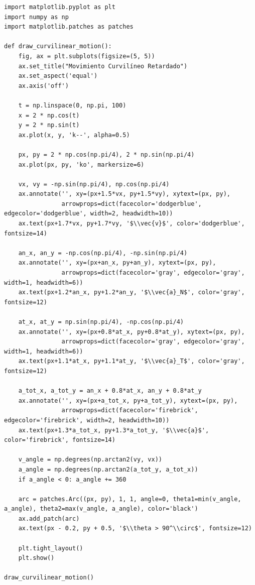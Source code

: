\documentclass[12pt, a4paper]{article}
\begin{document}
\begin{lstlisting}
import matplotlib.pyplot as plt
import numpy as np
import matplotlib.patches as patches

def draw_curvilinear_motion():
    fig, ax = plt.subplots(figsize=(5, 5))
    ax.set_title("Movimiento Curvilíneo Retardado")
    ax.set_aspect('equal')
    ax.axis('off')
    
    t = np.linspace(0, np.pi, 100)
    x = 2 * np.cos(t)
    y = 2 * np.sin(t)
    ax.plot(x, y, 'k--', alpha=0.5) 
    
    px, py = 2 * np.cos(np.pi/4), 2 * np.sin(np.pi/4)
    ax.plot(px, py, 'ko', markersize=6)
    
    vx, vy = -np.sin(np.pi/4), np.cos(np.pi/4) 
    ax.annotate('', xy=(px+1.5*vx, py+1.5*vy), xytext=(px, py),
                arrowprops=dict(facecolor='dodgerblue', edgecolor='dodgerblue', width=2, headwidth=10))
    ax.text(px+1.7*vx, py+1.7*vy, '$\\vec{v}$', color='dodgerblue', fontsize=14)
    
    an_x, an_y = -np.cos(np.pi/4), -np.sin(np.pi/4) 
    ax.annotate('', xy=(px+an_x, py+an_y), xytext=(px, py),
                arrowprops=dict(facecolor='gray', edgecolor='gray', width=1, headwidth=6))
    ax.text(px+1.2*an_x, py+1.2*an_y, '$\\vec{a}_N$', color='gray', fontsize=12)
    
    at_x, at_y = np.sin(np.pi/4), -np.cos(np.pi/4)
    ax.annotate('', xy=(px+0.8*at_x, py+0.8*at_y), xytext=(px, py),
                arrowprops=dict(facecolor='gray', edgecolor='gray', width=1, headwidth=6))
    ax.text(px+1.1*at_x, py+1.1*at_y, '$\\vec{a}_T$', color='gray', fontsize=12)
    
    a_tot_x, a_tot_y = an_x + 0.8*at_x, an_y + 0.8*at_y
    ax.annotate('', xy=(px+a_tot_x, py+a_tot_y), xytext=(px, py),
                arrowprops=dict(facecolor='firebrick', edgecolor='firebrick', width=2, headwidth=10))
    ax.text(px+1.3*a_tot_x, py+1.3*a_tot_y, '$\\vec{a}$', color='firebrick', fontsize=14)

    v_angle = np.degrees(np.arctan2(vy, vx))
    a_angle = np.degrees(np.arctan2(a_tot_y, a_tot_x))
    if a_angle < 0: a_angle += 360
    
    arc = patches.Arc((px, py), 1, 1, angle=0, theta1=min(v_angle, a_angle), theta2=max(v_angle, a_angle), color='black')
    ax.add_patch(arc)
    ax.text(px - 0.2, py + 0.5, '$\\theta > 90^\\circ$', fontsize=12)

    plt.tight_layout()
    plt.show()

draw_curvilinear_motion()
\end{lstlisting}
\end{document}

